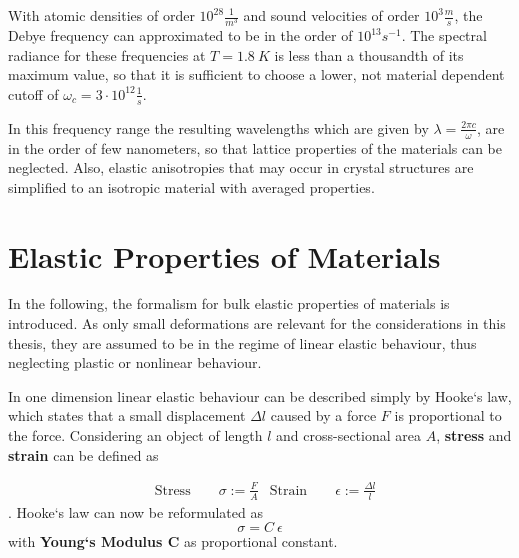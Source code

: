 With atomic densities
of order $10^{28}\si{\frac{1}{m^3}}$ and sound velocities of order
$10^3\si{\frac{m}{s}}$, the Debye frequency can approximated to be in
the order of $10^{13}\si{s^{-1}}$. The spectral radiance for these frequencies
at $T=1.8\ \si{K}$ is less than a thousandth of its maximum value, so that it
is
sufficient to choose a lower, not material dependent
cutoff of $\omega_c=3\cdot 10^{12}\si{\frac{1}{s}}$.

In this frequency range the resulting wavelengths which are given by
$\lambda= \frac{2\pi c}{\omega}$, are in the order of few nanometers, so that
lattice properties of the materials can be neglected. Also, elastic
anisotropies that may occur in crystal structures are simplified to an
isotropic material with averaged properties.

\section{Elastic Properties of Materials}
In the following, the formalism for bulk elastic properties of materials is
introduced. As only small deformations are relevant for the considerations in
this thesis, they are assumed to be in the regime of linear elastic behaviour,
thus neglecting plastic or nonlinear behaviour.

In one dimension linear elastic behaviour can be described simply
by Hooke`s law, which states that a small displacement $\Delta l$ caused by a
force $F$ is proportional to the force.
Considering an object of length $l$ and cross-sectional area $A$,
\textbf{stress} and \textbf{strain} can be defined as

\begin{align}
     & \text{Stress} \quad \quad \sigma := \frac{F}{A}
     & \text{Strain} \quad \quad \epsilon := \frac{\Delta l}{l}
\end{align}.
Hooke`s law can now be reformulated as
\begin{equation}
    \label{eq:HookStress1D}
    \sigma = C\ \epsilon
\end{equation}
with \textbf{Young`s Modulus C} as proportional constant.

